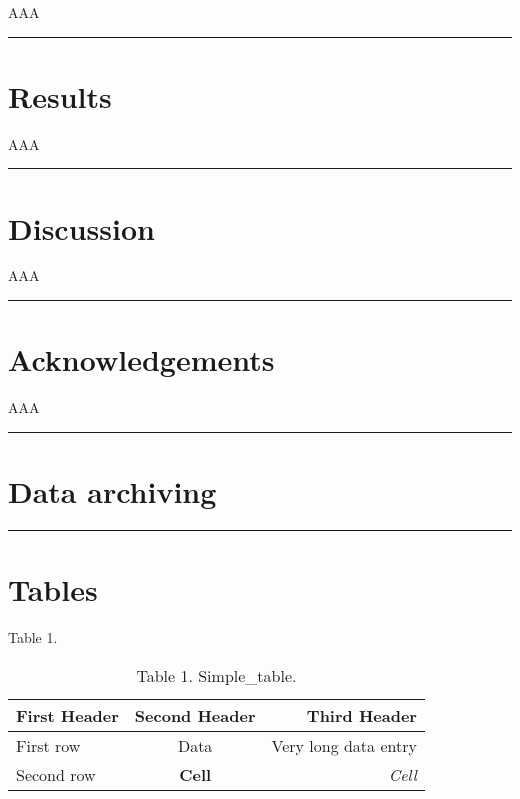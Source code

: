 AAA

\begin{center}\rule{3in}{0.4pt}\end{center}


\section{Results}
\label{results}

AAA

\begin{center}\rule{3in}{0.4pt}\end{center}


\section{Discussion}
\label{discussion}

AAA 

\begin{center}\rule{3in}{0.4pt}\end{center}


\section{Acknowledgements}
\label{acknowledgements}

AAA 

\begin{center}\rule{3in}{0.4pt}\end{center}


\section{Data archiving}
\label{dataarchiving}

\begin{center}\rule{3in}{0.4pt}\end{center}


\section{Tables}
\label{tables}

Table 1. 

\begin{table}[htbp]
\begin{minipage}{\linewidth}
\setlength{\tymax}{0.5\linewidth}
\centering
\small
\caption{Table 1. Simple\_table.}
\label{table1.simple_table.}
\begin{tabulary}{\textwidth}{@{}LCR@{}} \toprule
First Header&Second Header&Third Header\\
\midrule
First row&Data&Very long data entry\\
Second row&\textbf{Cell}&\emph{Cell}\\

\bottomrule

\end{tabulary}
\end{minipage}
\end{table}

